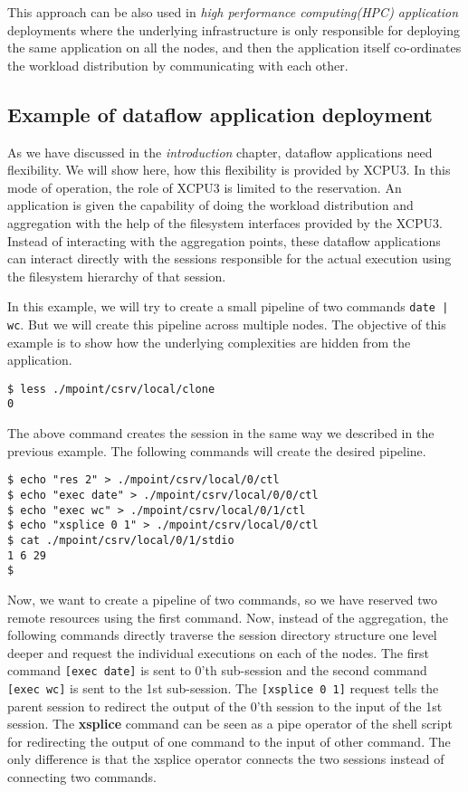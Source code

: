 This approach can be also used in \textit{high performance computing(HPC)
application} deployments where the underlying infrastructure is only responsible
for deploying the same application on all the nodes, and then the application
itself co-ordinates the workload distribution by communicating with each other.


\subsection{Example of dataflow application deployment}
As we have discussed in the \textit{introduction} chapter, dataflow applications
need flexibility. We will show here, how this flexibility is provided by XCPU3. 
In this mode of operation, the role of XCPU3 is limited to the reservation. 
An application is given the capability of doing the workload distribution and
aggregation with the help of the filesystem interfaces provided by the XCPU3.
Instead of interacting with the aggregation points, these dataflow applications
can interact directly with the sessions responsible for the actual execution
using the filesystem hierarchy of that session.

In this example, we will try to create a small pipeline of two commands
\texttt{date | wc}.  But we will create this pipeline across multiple nodes. 
The objective of this example is to show how the underlying complexities are
hidden from the application.

\begin{verbatim}
$ less ./mpoint/csrv/local/clone
0 
\end{verbatim}
The above command creates the session in the same way we described in the
previous example.  The following commands will create the desired pipeline.

\begin{verbatim}
$ echo "res 2" > ./mpoint/csrv/local/0/ctl
$ echo "exec date" > ./mpoint/csrv/local/0/0/ctl
$ echo "exec wc" > ./mpoint/csrv/local/0/1/ctl
$ echo "xsplice 0 1" > ./mpoint/csrv/local/0/ctl
$ cat ./mpoint/csrv/local/0/1/stdio
1 6 29
$
\end{verbatim}

Now, we want to create a pipeline of two commands, so we have reserved two
remote resources using the first command.  Now, instead of the aggregation, the
following commands directly traverse the session directory structure one level
deeper and request the individual executions on each of the nodes.  The first
command \texttt{[exec date]} is sent to 0'th sub-session and the second command
\texttt{[exec wc]} is sent to the 1st sub-session.  The \texttt{[xsplice 0 1]}
request tells the parent session to redirect the output of the 0'th session to
the input of the 1st session.  The \textbf{xsplice} command can be seen as a
pipe operator of the shell script for redirecting the output of one command to
the input of other command.  The only difference is that the xsplice operator
connects the two sessions instead of connecting two commands.

